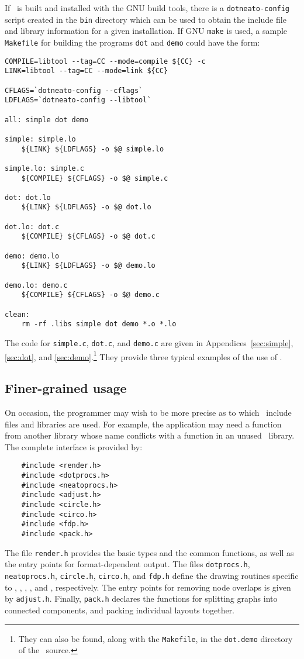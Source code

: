 If \gviz\ is built and installed with the GNU build tools, 
there is a {\tt dotneato-config} script created in the {\tt bin} 
directory which can be used
to obtain the include file and library information for 
a given installation.
If GNU {\tt make} is used, a sample {\tt Makefile} for building the
programs {\tt dot} and {\tt demo} could have the form:

\begin{verbatim}
COMPILE=libtool --tag=CC --mode=compile ${CC} -c
LINK=libtool --tag=CC --mode=link ${CC}

CFLAGS=`dotneato-config --cflags`
LDFLAGS=`dotneato-config --libtool`

all: simple dot demo

simple: simple.lo
    ${LINK} ${LDFLAGS} -o $@ simple.lo

simple.lo: simple.c
    ${COMPILE} ${CFLAGS} -o $@ simple.c

dot: dot.lo
    ${LINK} ${LDFLAGS} -o $@ dot.lo

dot.lo: dot.c
    ${COMPILE} ${CFLAGS} -o $@ dot.c

demo: demo.lo
    ${LINK} ${LDFLAGS} -o $@ demo.lo

demo.lo: demo.c
    ${COMPILE} ${CFLAGS} -o $@ demo.c

clean:
    rm -rf .libs simple dot demo *.o *.lo
\end{verbatim}

The code for {\tt simple.c}, {\tt dot.c}, and {\tt demo.c} are given in 
Appendices~\ref{sec:simple}, \ref{sec:dot}, and \ref{sec:demo}.\footnote{They
can also be found, along with the {\tt Makefile}, in the
{\tt dot.demo} directory of the \gviz\ source.} They provide three
typical examples of the use of \gviz.

\subsection{Finer-grained usage}

On occasion, the programmer may wish to be more precise as to which \gviz\
include files and libraries are used. For example, the application may need
a function from another library whose name conflicts with a function in an
unused \gviz\ library.
The complete interface is provided by:
\begin{verbatim}
    #include <render.h>
    #include <dotprocs.h>
    #include <neatoprocs.h>
    #include <adjust.h>
    #include <circle.h>
    #include <circo.h>
    #include <fdp.h>
    #include <pack.h>
\end{verbatim}
The file {\tt render.h} provides the basic types and the common
functions, as well as the entry points for format-dependent output.
The files {\tt dotprocs.h}, {\tt neatoprocs.h}, {\tt circle.h},
{\tt circo.h}, and {\tt fdp.h}
define the drawing routines specific to \dot, \neato,
\twopi, \circo, and \fdp, respectively.
The entry points for removing node overlaps is given by {\tt adjust.h}.
Finally, {\tt pack.h} declares the functions for splitting graphs into
connected components, and packing individual layouts together.


